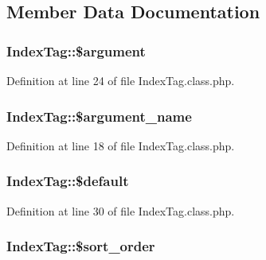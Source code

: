 \subsection{Member Data Documentation}
\subsubsection[{\texorpdfstring{\$argument}{$argument}}]{\setlength{\rightskip}{0pt plus 5cm}Index\+Tag\+::\$argument}\hypertarget{classIndexTag_a5d1d862f8c1ebcd6ddb15bb2c9da2e4b}{}\label{classIndexTag_a5d1d862f8c1ebcd6ddb15bb2c9da2e4b}


Definition at line 24 of file Index\+Tag.\+class.\+php.

\subsubsection[{\texorpdfstring{\$argument\+\_\+name}{$argument_name}}]{\setlength{\rightskip}{0pt plus 5cm}Index\+Tag\+::\$argument\+\_\+name}\hypertarget{classIndexTag_a92f6892b11fed081293fdaabb58f36a0}{}\label{classIndexTag_a92f6892b11fed081293fdaabb58f36a0}


Definition at line 18 of file Index\+Tag.\+class.\+php.

\subsubsection[{\texorpdfstring{\$default}{$default}}]{\setlength{\rightskip}{0pt plus 5cm}Index\+Tag\+::\$default}\hypertarget{classIndexTag_ae24a36bb56ebc33a9161a64b12f92f18}{}\label{classIndexTag_ae24a36bb56ebc33a9161a64b12f92f18}


Definition at line 30 of file Index\+Tag.\+class.\+php.

\subsubsection[{\texorpdfstring{\$sort\+\_\+order}{$sort_order}}]{\setlength{\rightskip}{0pt plus 5cm}Index\+Tag\+::\$sort\+\_\+order}\hypertarget{classIndexTag_a68336fd5e6a3fa09e2659359cce027fb}{}\label{classIndexTag_a68336fd5e6a3fa09e2659359cce027fb}


